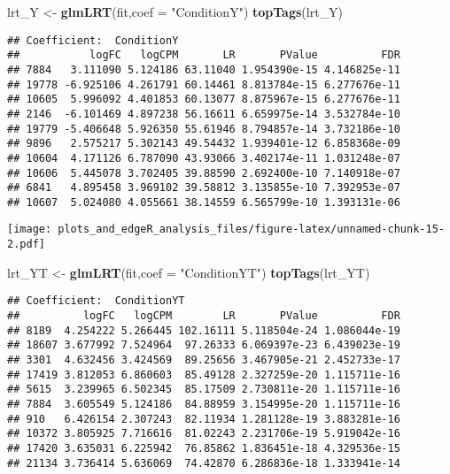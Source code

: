 \documentclass[]{article}
\newenvironment{Shaded}{\begin{snugshade}}{\end{snugshade}}
\newcommand{\KeywordTok}[1]{\textcolor[rgb]{0.13,0.29,0.53}{\textbf{#1}}}
\newcommand{\DataTypeTok}[1]{\textcolor[rgb]{0.13,0.29,0.53}{#1}}
\newcommand{\StringTok}[1]{\textcolor[rgb]{0.31,0.60,0.02}{#1}}
\newcommand{\OperatorTok}[1]{\textcolor[rgb]{0.81,0.36,0.00}{\textbf{#1}}}
\newcommand{\NormalTok}[1]{#1}
\begin{document}
\begin{Shaded}
\begin{Highlighting}[]
\NormalTok{lrt_Y <-}\StringTok{ }\KeywordTok{glmLRT}\NormalTok{(fit,}\DataTypeTok{coef =} \StringTok{"ConditionY"}\NormalTok{)}
\KeywordTok{topTags}\NormalTok{(lrt_Y)}
\end{Highlighting}
\end{Shaded}

\begin{verbatim}
## Coefficient:  ConditionY 
##           logFC   logCPM       LR       PValue          FDR
## 7884   3.111090 5.124186 63.11040 1.954390e-15 4.146825e-11
## 19778 -6.925106 4.261791 60.14461 8.813784e-15 6.277676e-11
## 10605  5.996092 4.401853 60.13077 8.875967e-15 6.277676e-11
## 2146  -6.101469 4.897238 56.16611 6.659975e-14 3.532784e-10
## 19779 -5.406648 5.926350 55.61946 8.794857e-14 3.732186e-10
## 9896   2.575217 5.302143 49.54432 1.939401e-12 6.858368e-09
## 10604  4.171126 6.787090 43.93066 3.402174e-11 1.031248e-07
## 10606  5.445078 3.702405 39.88590 2.692400e-10 7.140918e-07
## 6841   4.895458 3.969102 39.58812 3.135855e-10 7.392953e-07
## 10607  5.024080 4.055661 38.14559 6.565799e-10 1.393131e-06
\end{verbatim}

\begin{Shaded}
\end{Shaded}

\texttt{[image: plots\_and\_edgeR\_analysis\_files/figure-latex/unnamed-chunk-15-2.pdf]}

\begin{Shaded}
\begin{Highlighting}[]
\NormalTok{lrt_YT <-}\StringTok{ }\KeywordTok{glmLRT}\NormalTok{(fit,}\DataTypeTok{coef =} \StringTok{"ConditionYT"}\NormalTok{)}
\KeywordTok{topTags}\NormalTok{(lrt_YT)}
\end{Highlighting}
\end{Shaded}

\begin{verbatim}
## Coefficient:  ConditionYT 
##          logFC   logCPM        LR       PValue          FDR
## 8189  4.254222 5.266445 102.16111 5.118504e-24 1.086044e-19
## 18607 3.677992 7.524964  97.26333 6.069397e-23 6.439023e-19
## 3301  4.632456 3.424569  89.25656 3.467905e-21 2.452733e-17
## 17419 3.812053 6.860603  85.49128 2.327259e-20 1.115711e-16
## 5615  3.239965 6.502345  85.17509 2.730811e-20 1.115711e-16
## 7884  3.605549 5.124186  84.88959 3.154995e-20 1.115711e-16
## 910   6.426154 2.307243  82.11934 1.281128e-19 3.883281e-16
## 10372 3.805925 7.716616  81.02243 2.231706e-19 5.919042e-16
## 17420 3.635031 6.225942  76.85862 1.836451e-18 4.329536e-15
## 21134 3.736414 5.636069  74.42870 6.286836e-18 1.333941e-14
\end{verbatim}
\end{document}
